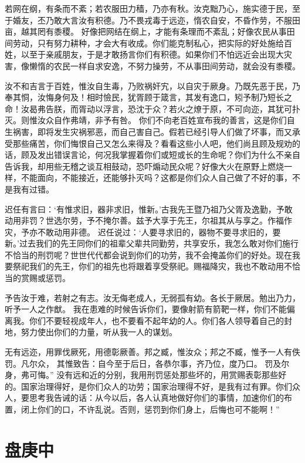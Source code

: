 \documentclass[a4paper,12pt,UTF8,twoside]{ctexbook}
\begin{document}
若网在纲，有条而不紊；若农服田力穑，乃亦有秋。汝克黜乃心，施实德于民，至于婚友，丕乃敢大言汝有积德。乃不畏戎毒于远迩，惰农自安，不昏作劳，不服田亩，越其罔有黍稷。
好像把网结在纲上，才能有条理而不紊乱；好像农民从事田间劳动，只有努力耕种，才会大有收成。你们能克制私心，把实际的好处施给百姓，以至于亲戚朋友，于是才敢扬言你们有积德。如果你们不怕远近会出现大灾害，像懒惰的农民一样自求安逸，不努力操劳，不从事田间劳动，就会没有黍稷。

汝不和吉言于百姓，惟汝自生毒，乃败祸奸宄，以自灾于厥身。乃既先恶于民，乃奉其恫，汝悔身何及！相时憸民，犹胥顾于箴言，其发有逸口，矧予制乃短长之命！汝曷弗告朕，而胥动以浮言，恐沈于众？若火之燎于原，不可向迩，其犹可扑灭。则惟汝众自作弗靖，非予有咎。
你们不向老百姓宣布我的善言，这是你们自生祸害，即将发生灾祸邪恶，而自己害自己。假若已经引导人们做了坏事，而又承受那些痛苦，你们悔恨自己又怎么来得及？看看这些小人吧，他们尚且顾及规劝的话，顾及发出错误言论，何况我掌握着你们或短或长的生命呢？你们为什么不亲自告诉我，却用些无稽之谈互相鼓动，恐吓煽动民众呢？好像大火在原野上燃烧一样，不能面向，不能接近，还能够扑灭吗？这都是你们众人自己做了不好的事，不是我有过错。

迟任有言曰：‘有惟求旧，器非求旧，惟新。’古我先王暨乃祖乃父胥及逸勤，予敢动用非罚？世选尔劳，予不掩尔善。兹予大享于先王，尔祖其从与享之。作福作灾，予亦不敢动用非德。
迟任说过：‘人要寻求旧的，器物不要寻求旧的，要新。’过去我们的先王同你们的祖辈父辈共同勤劳，共享安乐，我怎么敢对你们施行不恰当的刑罚呢？世世代代都会说到你们的功劳，我不会掩盖你们的好处。现在我要祭祀我们的先王，你们的祖先也将跟着享受祭祀。赐福降灾，我也不敢动用不恰当的赏赐或惩罚。

予告汝于难，若射之有志。汝无侮老成人，无弱孤有幼。各长于厥居。勉出乃力，听予一人之作猷。
我在患难的时候告诉你们，要像射箭有箭靶一样，你们不能偏离我。你们不要轻视成年人，也不要看不起年幼的人。你们各人领导着自己的封地，努力使出你们的力量，听从我一人的谋划。

无有远迩，用罪伐厥死，用德彰厥善。邦之臧，惟汝众；邦之不臧，惟予一人有佚罚。凡尔众， 其惟致告：自今至于后日，各恭尔事，齐乃位，度乃口。 罚及尔身，弗可悔。”
没有远和近的分别，我用刑罚惩处那些坏的，用赏赐表彰那些好的。国家治理得好，是你们众人的功劳；国家治理得不好，是我有过有罪。你们众人，要思考我告诫的话：从今以后，各人认真地做好你们的事情，加速你们的布置，闭上你们的口，不许乱说。否则，惩罚到你们身上，后悔也可不能啊！”

\chapter{盘庚中}
\end{document}
